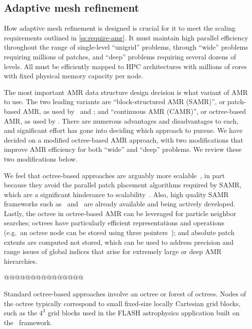 \documentclass[10pt]{article}
\begin{document}
\newpage
\subsection{Adaptive mesh refinement} \label{ss:design-amr}

How adaptive mesh refinement is designed is crucial for it to meet the
scaling requirements outlined in \ref{ss:require-amr}.  It must
maintain high parallel efficiency throughout the range of single-level
``unigrid'' problems, through ``wide'' problems requiring millions of
patches, and ``deep'' problems requiring several dozens of levels.
All must be efficiently mapped to HPC architectures with millions of
cores with fixed physical memory capacity per node.

The most important AMR data structure design decision is what variant
of AMR to use.  The two leading variants are ``block-structured AMR
(SAMR)'', or patch-based AMR, as used by \samrai\ and \chombo; and
``continuous AMR (CAMR)'', or octree-based AMR, as used by \paramesh.
There are numerous advantages and disadvantages to each, and
significant effort has gone into deciding which approach to pursue.
We have decided on a modified octree-based AMR approach, with two
modifications that improve AMR efficiency for both ``wide'' and
``deep'' problems.  We review these two modifications below.

We feel that octree-based approaches are arguably more
scalable~\cite{BuGh08}, in part because they avoid the parallel patch
placement algorithms required by SAMR, which are a significant
hinderance to scalability~\cite{GuWi06}.  Also, high quality SAMR
frameworks such as \chombo\ and \samrai\ are already available and
being actively developed.  Lastly, the octree in octree-based AMR can
be leveraged for particle neighbor searches; octrees have particularly
efficient representations and operations (e.g.~an octree node can be
stored using three pointers~\cite{@@@octree}); and absolute patch
extents are computed not stored, which can be used to address
precision and range issues of global indices that arise for extremely
large or deep AMR hierarchies.

@@@@@@@@@@@@@@@

Standard octree-based approaches involve an octree or forest of
octrees.  Nodes of the octree typically correspond to small fixed-size
locally Cartesian grid blocks, such as the $4^3$ grid blocks used in
the FLASH astrophysics application built on the \paramesh\ framework.
\end{document}
